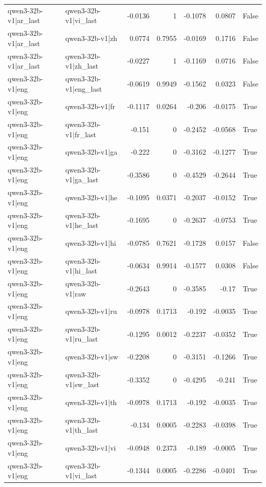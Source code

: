 \begin{table}
\begin{tabular}{l l r r r r l}
qwen3-32b-v1|ar_last & qwen3-32b-v1|vi_last & -0.0136 & 1 & -0.1078 & 0.0807 & False \\
qwen3-32b-v1|ar_last & qwen3-32b-v1|zh & 0.0774 & 0.7955 & -0.0169 & 0.1716 & False \\
qwen3-32b-v1|ar_last & qwen3-32b-v1|zh_last & -0.0227 & 1 & -0.1169 & 0.0716 & False \\
qwen3-32b-v1|eng & qwen3-32b-v1|eng_last & -0.0619 & 0.9949 & -0.1562 & 0.0323 & False \\
qwen3-32b-v1|eng & qwen3-32b-v1|fr & -0.1117 & 0.0264 & -0.206 & -0.0175 & True \\
qwen3-32b-v1|eng & qwen3-32b-v1|fr_last & -0.151 & 0 & -0.2452 & -0.0568 & True \\
qwen3-32b-v1|eng & qwen3-32b-v1|ga & -0.222 & 0 & -0.3162 & -0.1277 & True \\
qwen3-32b-v1|eng & qwen3-32b-v1|ga_last & -0.3586 & 0 & -0.4529 & -0.2644 & True \\
qwen3-32b-v1|eng & qwen3-32b-v1|he & -0.1095 & 0.0371 & -0.2037 & -0.0152 & True \\
qwen3-32b-v1|eng & qwen3-32b-v1|he_last & -0.1695 & 0 & -0.2637 & -0.0753 & True \\
qwen3-32b-v1|eng & qwen3-32b-v1|hi & -0.0785 & 0.7621 & -0.1728 & 0.0157 & False \\
qwen3-32b-v1|eng & qwen3-32b-v1|hi_last & -0.0634 & 0.9914 & -0.1577 & 0.0308 & False \\
qwen3-32b-v1|eng & qwen3-32b-v1|raw & -0.2643 & 0 & -0.3585 & -0.17 & True \\
qwen3-32b-v1|eng & qwen3-32b-v1|ru & -0.0978 & 0.1713 & -0.192 & -0.0035 & True \\
qwen3-32b-v1|eng & qwen3-32b-v1|ru_last & -0.1295 & 0.0012 & -0.2237 & -0.0352 & True \\
qwen3-32b-v1|eng & qwen3-32b-v1|sw & -0.2208 & 0 & -0.3151 & -0.1266 & True \\
qwen3-32b-v1|eng & qwen3-32b-v1|sw_last & -0.3352 & 0 & -0.4295 & -0.241 & True \\
qwen3-32b-v1|eng & qwen3-32b-v1|th & -0.0978 & 0.1713 & -0.192 & -0.0035 & True \\
qwen3-32b-v1|eng & qwen3-32b-v1|th_last & -0.134 & 0.0005 & -0.2283 & -0.0398 & True \\
qwen3-32b-v1|eng & qwen3-32b-v1|vi & -0.0948 & 0.2373 & -0.189 & -0.0005 & True \\
qwen3-32b-v1|eng & qwen3-32b-v1|vi_last & -0.1344 & 0.0005 & -0.2286 & -0.0401 & True \\

\end{tabular}
\end{table}
